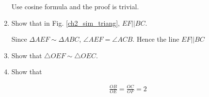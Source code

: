\begin{enumerate}[label=\arabic*.,ref=\thesubsection.\theenumi]
\solution Use cosine formula and the proof is trivial.
\item	Show that in Fig. \ref{ch2_sim_triang}, $EF || BC$.

\solution Since $\Delta AEF \sim \Delta ABC$, $\angle AEF = \angle ACB$.  Hence the line $EF||BC$
%
\item	Show that $\triangle OEF \sim \triangle OEC$.

\item Show that

	\begin{align}
	\frac{OB}{OE} = \frac{OC}{OF} = 2
	\end{align}

%
%

%
%		
%


\end{enumerate}
